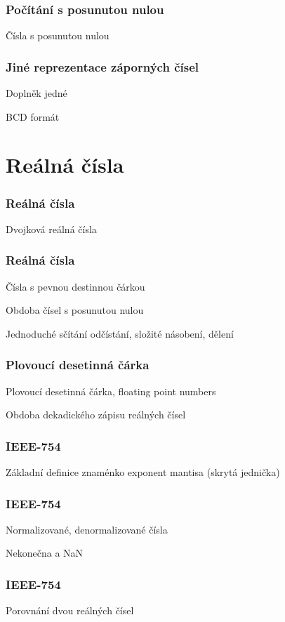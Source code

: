 \documentclass{beamer}
\begin{document}
\begin{frame}
\frametitle{Počítání s posunutou nulou}

Čísla s posunutou nulou
\end{frame}


\begin{frame}
\frametitle{Jiné reprezentace záporných čísel}

Doplněk jedné

BCD formát
\end{frame}


\section{Reálná čísla}


\begin{frame}
\frametitle{Reálná čísla}

Dvojková reálná čísla

\end{frame}


\begin{frame}
\frametitle{Reálná čísla}

Čísla s pevnou destinnou čárkou

Obdoba čísel s posunutou nulou

Jednoduché sčítání odčístání, složité násobení, dělení
\end{frame}

\begin{frame}
\frametitle{Plovoucí desetinná čárka}

Plovoucí desetinná čárka, floating point numbers

Obdoba dekadického zápisu reálných čísel

\end{frame}

\begin{frame}
\frametitle{IEEE-754}

Základní definice znaménko exponent mantisa (skrytá jednička) 
\end{frame}


\begin{frame}
\frametitle{IEEE-754}

Normalizované, denormalizované čísla

Nekonečna a NaN
\end{frame}

\begin{frame}
\frametitle{IEEE-754}

Porovnání dvou reálných čísel

\end{frame}
\end{document}
